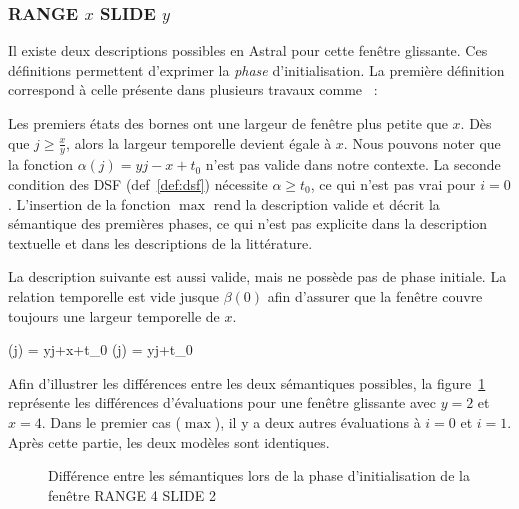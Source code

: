 \subsubsection{RANGE $x$ SLIDE $y$}
Il existe deux descriptions possibles en Astral pour cette fenêtre glissante. Ces définitions permettent d'exprimer la \textit{phase} d'initialisation. La première définition correspond à celle présente dans plusieurs travaux comme~\cite{Jain:spread} :


Les premiers états des bornes ont une largeur de fenêtre plus petite que $x$. Dès que $j \geq \frac xy$, alors la largeur temporelle devient égale à $x$. Nous pouvons noter que la fonction $\alpha(j) = yj-x+t_0$ n'est pas valide dans notre contexte. La seconde condition des DSF (def~\ref{def:dsf}) nécessite $\alpha \geq t_0$, ce qui n'est pas vrai pour $i=0$. L'insertion de la fonction $\max$ rend la description valide et décrit la sémantique des premières phases, ce qui n'est pas explicite dans la description textuelle et dans les descriptions de la littérature.

La description suivante est aussi valide, mais ne possède pas de phase initiale. La relation temporelle est vide jusque $\beta(0)$ afin d'assurer que la fenêtre couvre toujours une largeur temporelle de $x$.

	{\beta(j) = yj+x+t_0}
	{\alpha(j) = yj+t_0}

Afin d'illustrer les différences entre les deux sémantiques possibles, la figure~\ref{fig:valid:expressivite:slidemax} représente les différences d'évaluations pour une fenêtre glissante avec $y=2$ et $x=4$. Dans le premier cas ($\max$), il y a deux autres évaluations à $i=0$ et $i=1$. Après cette partie, les deux modèles sont identiques.

\begin{figure}[ht]
\centering
\def\lgrad#1{\draw [thick] (#1,0) -- (#1,-0.2); \node [below] at (#1,-0.2){#1};}
\def\seg#1#2#3#4#5{\draw [thick] (#1#40.1,#3+0.25) -- (#1,#3+0.25) -- (#1,#3-0.25) -- (#1#40.1,#3-0.25); \draw [thick] (#1,#3) -- (#2,#3); \draw [thick] (#2#50.1,#3+0.25) -- (#2,#3+0.25) -- (#2,#3-0.25) -- (#2#50.1,#3-0.25);}
\def\seglbl#1#2#3#4#5#6{\seg{#1}{#2}{#3}{#4}{#5}\node [above] at (0.5*#1+0.5*#2,#3){#6};}
\caption{Différence entre les sémantiques lors de la phase d'initialisation de la fenêtre RANGE 4 SLIDE 2}\label{fig:valid:expressivite:slidemax}
\end{figure}

